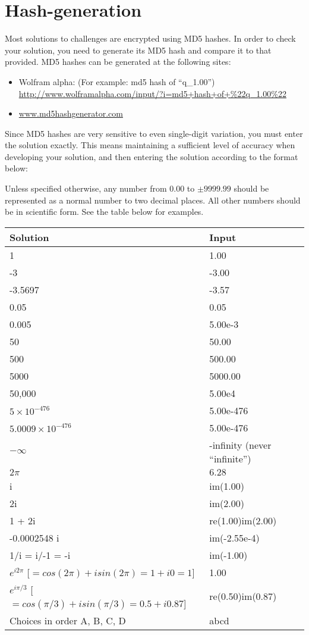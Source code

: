 \newpage
\section{Hash-generation}
\label{sec:hashes}

Most solutions to challenges are encrypted using MD5 hashes. In order to check your solution, you need to generate its MD5 hash and compare it to that provided.  MD5 hashes can be generated at the following sites:

\begin{itemize}
    \item Wolfram alpha: (For example: md5 hash of ``q\_1.00'') \url{http://www.wolframalpha.com/input/?i=md5+hash+of+\%22q_1.00\%22}
    \item \url{www.md5hashgenerator.com}
\end{itemize}

Since MD5 hashes are very sensitive to even single-digit variation, you must enter the solution exactly. This means maintaining a sufficient level of accuracy when developing your solution, and then entering the solution according to the format below:

Unless specified otherwise, any number from $0.00$ to $\pm 9999.99$ should be represented as a normal number to two decimal places. All other numbers should be in scientific form. See the table below for examples.

\begin{center}
\begin{tabular}{|l|l|}
    \hline
    \textbf{Solution} & \textbf{Input} \\ \hline
    1 & 1.00 \\
    -3 & -3.00 \\
    -3.5697 & -3.57 \\
    0.05 & 0.05 \\
    0.005 & 5.00e-3 \\
    50 & 50.00 \\
    500 & 500.00 \\
    5000 & 5000.00 \\
    50,000 & 5.00e4 \\
    $5 \times 10^{-476}$ & 5.00e-476 \\
    $5.0009 \times 10^{-476}$ & 5.00e-476 \\
    $-\infty$ & -infinity (never ``infinite'')\\
    $2 \pi$ & $6.28$ \\
    i & im(1.00) \\
    2i & im(2.00) \\
    1 + 2i & re(1.00)im(2.00) \\
    -0.0002548 i & im(-2.55e-4) \\
    1/i = i/-1 = -i & im(-1.00) \\
    $e^{i2\pi}$ [$= cos(2 \pi) + isin(2 \pi) = 1 + i0 = 1$] & 1.00 \\
    $e^{i\pi/3}$ [$= cos(\pi/3) + isin(\pi/3) = 0.5 + i 0.87$] & re(0.50)im(0.87) \\
    Choices in order A, B, C, D & abcd \\
    \hline
\end{tabular}
\end{center}

